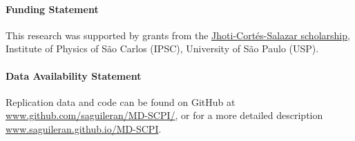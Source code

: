 \documentclass[
  journal=usp, %
  manuscript=final-report,
  year=2023,
  volume=1,
]{cup-journal}
\begin{document}





\paragraph{Funding Statement}

This research was supported by grants from the \href{https://www.ifsc.usp.br/crint/call-for-internships/}{Jhoti-Cortés-Salazar scholarship}, Institute of Physics of São Carlos (IPSC), University of São Paulo (USP).



\paragraph{Data Availability Statement}

Replication data and code can be found on GitHub at
\href{https://github.com/saguileran/MD-SCPI/}{www.github.com/saguileran/MD-SCPI/}, or for a more detailed description \href{https://saguileran.github.io/MD-SCPI/}{www.saguileran.github.io/MD-SCPI}.
\end{document}
